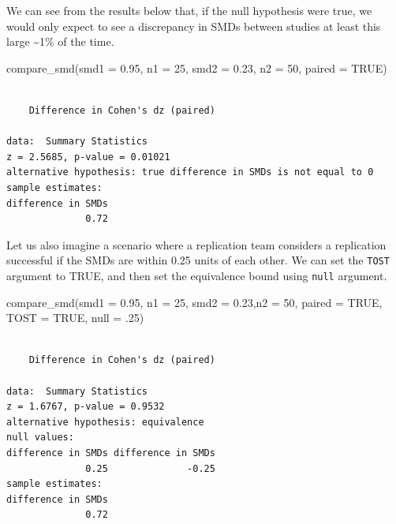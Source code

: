 \documentclass[
]{interact}
\newenvironment{Shaded}{\begin{snugshade}}{\end{snugshade}}
\newcommand{\AttributeTok}[1]{\textcolor[rgb]{0.40,0.45,0.13}{#1}}
\newcommand{\ConstantTok}[1]{\textcolor[rgb]{0.56,0.35,0.01}{#1}}
\newcommand{\DecValTok}[1]{\textcolor[rgb]{0.68,0.00,0.00}{#1}}
\newcommand{\FloatTok}[1]{\textcolor[rgb]{0.68,0.00,0.00}{#1}}
\newcommand{\FunctionTok}[1]{\textcolor[rgb]{0.28,0.35,0.67}{#1}}
\newcommand{\NormalTok}[1]{\textcolor[rgb]{0.00,0.23,0.31}{#1}}
\begin{document}
We can see from the results below that, if the null hypothesis were
true, we would only expect to see a discrepancy in SMDs between studies
at least this large \textasciitilde1\% of the time.

\begin{Shaded}
\begin{Highlighting}[]
\FunctionTok{compare\_smd}\NormalTok{(}\AttributeTok{smd1 =} \FloatTok{0.95}\NormalTok{,}
            \AttributeTok{n1 =} \DecValTok{25}\NormalTok{,}
            \AttributeTok{smd2 =} \FloatTok{0.23}\NormalTok{,}
            \AttributeTok{n2 =} \DecValTok{50}\NormalTok{,}
            \AttributeTok{paired =} \ConstantTok{TRUE}\NormalTok{)}
\end{Highlighting}
\end{Shaded}

\begin{verbatim}

    Difference in Cohen's dz (paired)

data:  Summary Statistics
z = 2.5685, p-value = 0.01021
alternative hypothesis: true difference in SMDs is not equal to 0
sample estimates:
difference in SMDs 
              0.72 
\end{verbatim}

Let us also imagine a scenario where a replication team considers a
replication successful if the SMDs are within 0.25 units of each other.
We can set the \texttt{TOST} argument to TRUE, and then set the
equivalence bound using \texttt{null} argument.

\begin{Shaded}
\begin{Highlighting}[]
\FunctionTok{compare\_smd}\NormalTok{(}\AttributeTok{smd1 =} \FloatTok{0.95}\NormalTok{, }\AttributeTok{n1 =} \DecValTok{25}\NormalTok{, }\AttributeTok{smd2 =} \FloatTok{0.23}\NormalTok{,}\AttributeTok{n2 =} \DecValTok{50}\NormalTok{,}
            \AttributeTok{paired =} \ConstantTok{TRUE}\NormalTok{, }\AttributeTok{TOST =} \ConstantTok{TRUE}\NormalTok{, }\AttributeTok{null =}\NormalTok{ .}\DecValTok{25}\NormalTok{)}
\end{Highlighting}
\end{Shaded}

\begin{verbatim}

    Difference in Cohen's dz (paired)

data:  Summary Statistics
z = 1.6767, p-value = 0.9532
alternative hypothesis: equivalence
null values:
difference in SMDs difference in SMDs 
              0.25              -0.25 
sample estimates:
difference in SMDs 
              0.72 
\end{verbatim}
\end{document}
